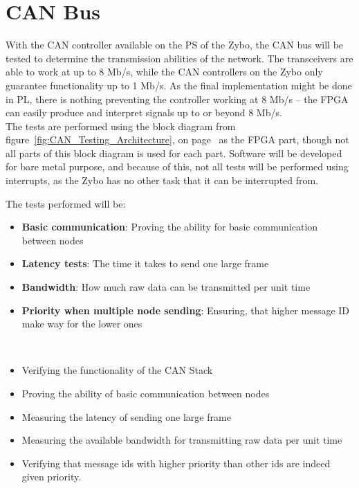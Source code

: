 
\section{CAN Bus}
\label{sub:CAN_Bus_Tests}
With the CAN controller available on the PS of the Zybo, the CAN bus will be tested to determine the transmission abilities of the network.
The transceivers are able to work at up to 8 Mb/s, while the CAN controllers on the Zybo only guarantee functionality up to 1 Mb/s. 
As the final implementation might be done in PL, there is nothing preventing the controller working at 8 Mb/s -- the FPGA can easily produce and interpret signals up to or beyond 8 Mb/s.\\

The tests are performed using the block diagram from figure~\ref{fig:CAN_Testing_Architecture}, on page~\pageref{fig:CAN_Testing_Architecture} as the FPGA part, though not all parts of this block diagram is used for each part.
Software will be developed for bare metal purpose, and because of this, not all tests will be performed using interrupts, as the Zybo has no other task that it can be interrupted from.

The tests performed will be: 
\begin{itemize}
	\item \textbf{Basic communication}: Proving the ability for basic communication between nodes
	\item \textbf{Latency tests}: The time it takes to send one large frame
	\item \textbf{Bandwidth}: How much raw data can be transmitted per unit time
	\item \textbf{Priority when multiple node sending}: Ensuring, that higher message ID make way for the lower ones 
\end{itemize}

\
\begin{itemize}
\item Verifying the functionality of the CAN Stack
\item Proving the ability of basic communication between nodes
\item Measuring the latency of sending one large frame
\item Measuring the available bandwidth for transmitting raw data per unit time
\item Verifying that message ids with higher priority than other ids are indeed given priority.
\end{itemize}

